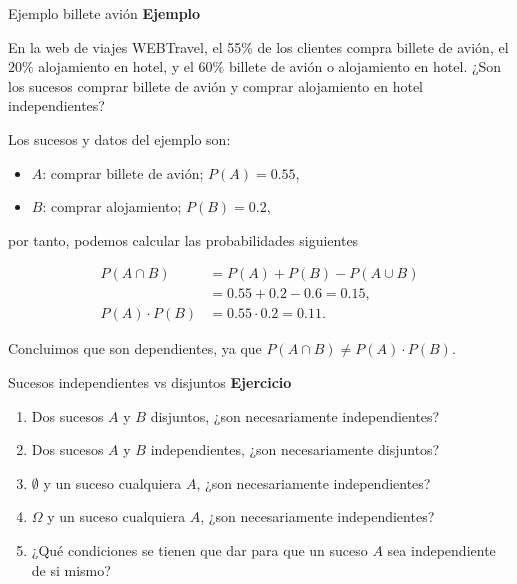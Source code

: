 \documentclass[
  ignorenonframetext,
]{beamer}
\providecommand{\tightlist}{%
  \setlength{\itemsep}{0pt}\setlength{\parskip}{0pt}}
\begin{document}
\begin{frame}{Ejemplo billete avión}
\protect\hypertarget{ejemplo-billete-aviuxf3n}{}
\textbf{Ejemplo}

En la web de viajes WEBTravel, el 55\% de los clientes compra billete de
avión, el \(20\%\) alojamiento en hotel, y el \(60\%\) billete de avión
o alojamiento en hotel. ¿Son los sucesos comprar billete de avión y
comprar alojamiento en hotel independientes?

Los sucesos y datos del ejemplo son:

\begin{itemize}
\tightlist
\item
  \(A\): comprar billete de avión; \(P(A)=0.55\),
\item
  \(B\): comprar alojamiento; \(P(B)=0.2\),
\end{itemize}

por tanto, podemos calcular las probabilidades siguientes

\[
\begin{array}{rl}
P(A\cap B) & =P(A)+P(B)-P(A\cup B)\\ & =0.55+0.2-0.6=0.15,\\ 
P(A)\cdot P(B) & = 0.55\cdot 0.2=0.11.
\end{array}
\]

Concluimos que son dependientes, ya que
\(P(A\cap B)\neq P(A)\cdot P(B)\).
\end{frame}

\begin{frame}{Sucesos independientes vs disjuntos}
\protect\hypertarget{sucesos-independientes-vs-disjuntos}{}
\textbf{Ejercicio}

\begin{enumerate}
\tightlist
\item
  Dos sucesos \(A\) y \(B\) disjuntos, ¿son necesariamente
  independientes?
\item
  Dos sucesos \(A\) y \(B\) independientes, ¿son necesariamente
  disjuntos?
\item
  \(\emptyset\) y un suceso cualquiera \(A\), ¿son necesariamente
  independientes?
\item
  \(\Omega\) y un suceso cualquiera \(A\), ¿son necesariamente
  independientes?
\item
  ¿Qué condiciones se tienen que dar para que un suceso \(A\) sea
  independiente de si mismo?
\end{enumerate}
\end{frame}
\end{document}
